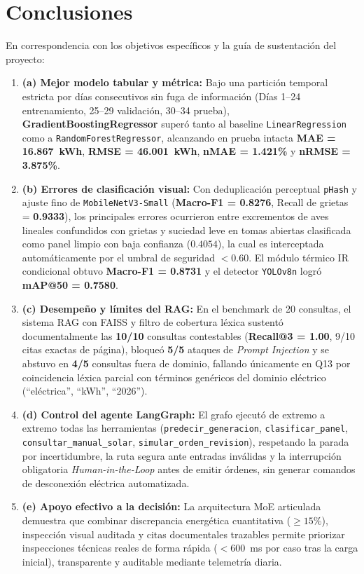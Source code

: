 \documentclass[12pt,a4paper]{article}
\begin{document}
\section{Conclusiones}
\label{sec:conclusiones}
En correspondencia con los objetivos específicos y la guía de sustentación del proyecto:
\begin{enumerate}
    \item \textbf{(a) Mejor modelo tabular y métrica:} Bajo una partición temporal estricta por días consecutivos sin fuga de información (Días 1--24 entrenamiento, 25--29 validación, 30--34 prueba), \textbf{GradientBoostingRegressor} superó tanto al baseline \texttt{LinearRegression} como a \texttt{RandomForestRegressor}, alcanzando en prueba intacta \textbf{MAE = 16.867~kWh}, \textbf{RMSE = 46.001~kWh}, \textbf{nMAE = 1.421\%} y \textbf{nRMSE = 3.875\%}.
    \item \textbf{(b) Errores de clasificación visual:} Con deduplicación perceptual \texttt{pHash} y ajuste fino de \texttt{MobileNetV3-Small} (\textbf{Macro-F1 = 0.8276}, Recall de grietas = \textbf{0.9333}), los principales errores ocurrieron entre excrementos de aves lineales confundidos con grietas y suciedad leve en tomas abiertas clasificada como panel limpio con baja confianza ($0.4054$), la cual es interceptada automáticamente por el umbral de seguridad $<0.60$. El módulo térmico IR condicional obtuvo \textbf{Macro-F1 = 0.8731} y el detector \texttt{YOLOv8n} logró \textbf{mAP@50 = 0.7580}.
    \item \textbf{(c) Desempeño y límites del RAG:} En el benchmark de 20 consultas, el sistema RAG con FAISS y filtro de cobertura léxica sustentó documentalmente las \textbf{10/10} consultas contestables (\textbf{Recall@3 = 1.00}, 9/10 citas exactas de página), bloqueó \textbf{5/5} ataques de \textit{Prompt Injection} y se abstuvo en \textbf{4/5} consultas fuera de dominio, fallando únicamente en Q13 por coincidencia léxica parcial con términos genéricos del dominio eléctrico (``eléctrica'', ``kWh'', ``2026'').
    \item \textbf{(d) Control del agente LangGraph:} El grafo ejecutó de extremo a extremo todas las herramientas (\texttt{predecir\_generacion}, \texttt{clasificar\_panel}, \texttt{consultar\_manual\_solar}, \texttt{simular\_orden\_revision}), respetando la parada por incertidumbre, la ruta segura ante entradas inválidas y la interrupción obligatoria \textit{Human-in-the-Loop} antes de emitir órdenes, sin generar comandos de desconexión eléctrica automatizada.
    \item \textbf{(e) Apoyo efectivo a la decisión:} La arquitectura MoE articulada demuestra que combinar discrepancia energética cuantitativa ($\geq 15\%$), inspección visual auditada y citas documentales trazables permite priorizar inspecciones técnicas reales de forma rápida ($< 600$~ms por caso tras la carga inicial), transparente y auditable mediante telemetría diaria.
\end{enumerate}
\end{document}
